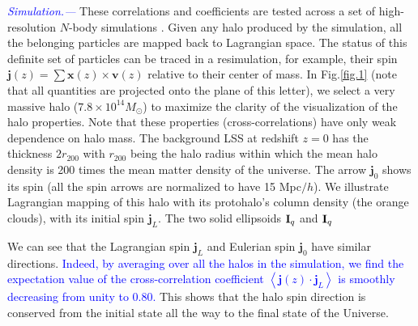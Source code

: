 \documentclass[aps,prd,twocolumn,amsmath,amssymb,amsfont,superscriptaddress]{revtex4-1}
\newcommand{\bs}{\boldsymbol}
\newcommand{\tcb}{\textcolor{blue}}
\begin{document}
\tcb{\textit{Simulation.---}}
These correlations and coefficients are tested across a set of high-resolution $N$-body simulations \citep{2018ApJS..237...24Y}. 
Given any halo produced by the simulation, all the belonging particles are mapped back to Lagrangian space. 
The status of this definite set of particles can be traced in a resimulation, for example, their spin $\bs{j}(z)=\sum\bs{x}(z)\times\bs{v}(z)$ relative to their center of mass. 
In Fig.\ref{fig.1} (note that all quantities are projected onto the plane of this letter), 
we select a very massive halo ($7.8\times 10^{14}M_\odot$) to maximize the clarity of the visualization of the halo properties.
Note that these properties (cross-correlations) have only weak dependence on halo mass. 
The background LSS at redshift $z=0$ has the thickness $2r_{200}$ with $r_{200}$ being the halo radius within which the mean halo density is 200 times the mean matter density of the universe.
The arrow $\bs{j}_0$ shows its spin (all the spin arrows are normalized to have 15 Mpc$/h$).
We illustrate Lagrangian mapping of this halo with its protohalo's column density (the orange clouds), with its initial spin $\bs{j}_L$. 
The two solid ellipsoids $\bold{I}_q$ and $\bold{I}_q$



 
 We can see that the Lagrangian spin $\bs{j}_L$ and Eulerian spin $\bs{j}_0$ have similar directions. \tcb{Indeed, by averaging over all the halos in the simulation, we find the expectation value of the cross-correlation coefficient $\left\langle \bs{j}(z) \cdot \bs{j}_L \right\rangle$ is smoothly decreasing from unity to 0.80.} This shows that the halo spin direction is conserved from the initial state all the way to the final state of the Universe.
\end{document}
